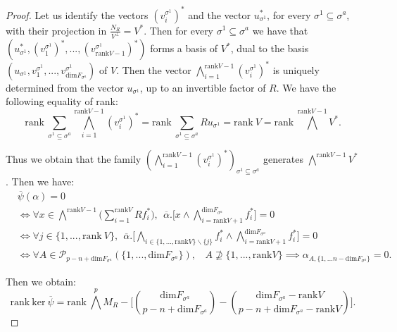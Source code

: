 \documentclass[10pt,a4paper]{amsart}
\begin{document}
\begin{proof}
    Let us identify the vectors $(v_i^{\sigma^1})^*$ and the vector $u_{\sigma^1}^*$, for every $\sigma^1 \subseteq \sigma^a$, with their projection in $\frac{N_R}{V^{\perp}}=V^*$. Then for every $\sigma^1 \subseteq \sigma^a$ we have that $(u_{\sigma^1}^*,(v_1^{\sigma^1})^*,...,(v_{\mathrm{rank}V-1}^{\sigma^1})^*)$ forms a basis of $V^*$, dual to the basis $(u_{\sigma^1},v^{\sigma^1}_1,...,v^{\sigma^1}_{\mathrm{dim}F_{\sigma^a}})$ of $V$. Then the vector $\bigwedge_{i=1}^{\mathrm{rank}V -1}(v_i^{\sigma^1})^*$ is uniquely determined from the vector $u_{\sigma^1}$, up to an invertible factor of $R$. We have the following equality of rank:
    \begin{equation*}
        \mathrm{rank} ~ \sum_{\sigma^1 \subseteq \sigma^a} \bigwedge_{i=1}^{\mathrm{rank}V -1}(v_i^{\sigma^1})^* = \mathrm{rank}~ \sum_{\sigma^1 \subseteq \sigma^a} Ru_{\sigma^1} = \mathrm{rank}~ V = \mathrm{rank}~\bigwedge^{\mathrm{rank} V -1}V^*.
    \end{equation*}

    Thus we obtain that the family $( \bigwedge_{i=1}^{\mathrm{rank}V-1}(v_i^{\sigma^1})^*)_{\sigma^1 \subseteq \sigma^a}$ generates $\bigwedge^{\mathrm{rank} V -1}V^*$. Then we have:
    \begin{align*}
        &\overline{\psi}(\alpha) = 0 \\
        &\iff \forall x \in\bigwedge^{\mathrm{rank} V -1}\Bigg(\sum_{i=1}^{\mathrm{rank}V}Rf_i^*\Bigg), ~~\overline{\alpha}.\Bigg[x\wedge\bigwedge_{i=\mathrm{rank}V+1}^{\mathrm{dim}F_{\sigma^a}} f_i^*\Bigg] =0 \\
        & \iff \forall j \in \{1,...,\mathrm{rank}~V\},~~\overline{\alpha}.\Bigg[ \bigwedge_{i\in \{1,...,\mathrm{rank}V\}\backslash \{j\}} f_i^*\wedge\bigwedge_{i=\mathrm{rank}V+1}^{\mathrm{dim}F_{\sigma^a}} f_i^*\Bigg] =0 \\
        & \iff \forall A \in \mathcal{P}_{p-n+\mathrm{dim} F_{\sigma^a}}(\{1,...,\mathrm{dim}F_{\sigma^a}\}), ~~~~A \not\supseteq \{1,...,\mathrm{rank}V\} \implies\alpha_{A,\{1,...n-\mathrm{dim} F_{\sigma^a}\}}=0.
    \end{align*}

    Then we obtain:
    \begin{equation*}
        \mathrm{rank} ~\mathrm{ker} ~\overline{\psi}  = \mathrm{rank} ~ \bigwedge^p M_R - \Bigg[\binom{\mathrm{dim}F_{\sigma^a}}{p-n+\mathrm{dim}F_{\sigma^a}}-\binom{\mathrm{dim}F_{\sigma^a}-\mathrm{rank}V}{p-n+\mathrm{dim}F_{\sigma^a}-\mathrm{rank}V}\Bigg].
    \end{equation*}


\end{proof}
\end{document}

